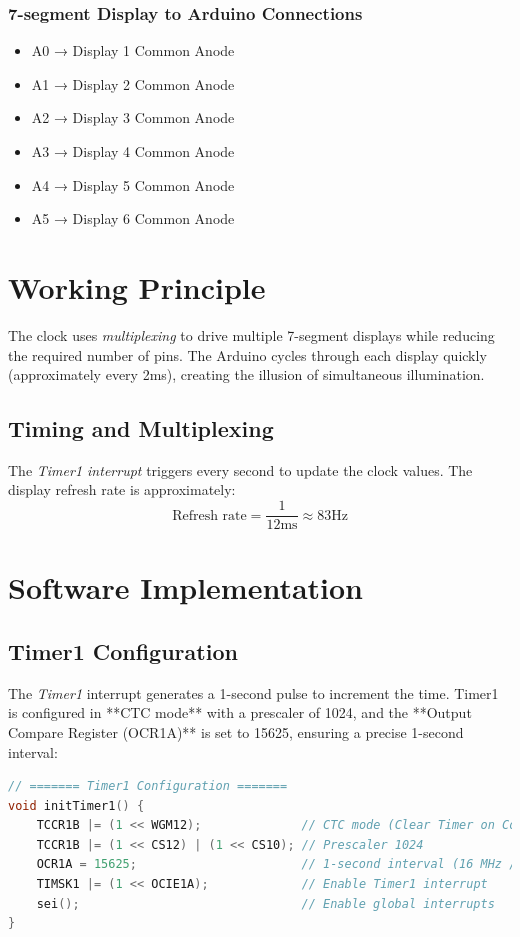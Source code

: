 \documentclass{article}
\begin{document}
\subsubsection{7-segment Display to Arduino Connections}
\begin{itemize}
    \item A0 → Display 1 Common Anode
    \item A1 → Display 2 Common Anode
    \item A2 → Display 3 Common Anode
    \item A3 → Display 4 Common Anode
    \item A4 → Display 5 Common Anode
    \item A5 → Display 6 Common Anode
\end{itemize}

\section{Working Principle}
The clock uses \textit{multiplexing} to drive multiple 7-segment displays while reducing the required number of pins. The Arduino cycles through each display quickly (approximately every 2ms), creating the illusion of simultaneous illumination.

\subsection{Timing and Multiplexing}
The \textit{Timer1 interrupt} triggers every second to update the clock values. The display refresh rate is approximately:
\[
\text{{Refresh rate}} = \frac{1}{12\text{ms}} \approx 83\text{Hz}
\]


\section{Software Implementation}

\subsection{Timer1 Configuration}
The \textit{Timer1} interrupt generates a 1-second pulse to increment the time. Timer1 is configured in **CTC mode** with a prescaler of 1024, and the **Output Compare Register (OCR1A)** is set to 15625, ensuring a precise 1-second interval:
\begin{lstlisting}[language=C]
// ======= Timer1 Configuration =======
void initTimer1() {
    TCCR1B |= (1 << WGM12);              // CTC mode (Clear Timer on Compare Match)
    TCCR1B |= (1 << CS12) | (1 << CS10); // Prescaler 1024
    OCR1A = 15625;                       // 1-second interval (16 MHz / 1024)
    TIMSK1 |= (1 << OCIE1A);             // Enable Timer1 interrupt
    sei();                               // Enable global interrupts
}
\end{lstlisting}
\end{document}
